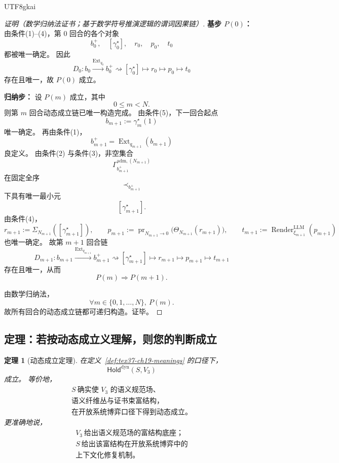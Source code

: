 \documentclass[12pt]{article}
\newtheorem{theorem}{定理}[section]
\newcommand{\Render}{\operatorname{Render}}
\begin{document}
\begin{CJK*}{UTF8}{gkai}
\begin{proof}[证明（数学归纳法证书；基于数学符号推演逻辑的谓词因果链）]
\textbf{基步 $P(0)$：}
由条件(1)--(4)，第 $0$ 回合的各个对象
\[
  b_0^+,\quad
  [\gamma_0^\star],\quad
  r_0,\quad
  p_0,\quad
  t_0
\]
都被唯一确定。
因此
\[
  D_0:
  b_0
  \xrightarrow{\operatorname{Ext}_{q_0}}
  b_0^+
  \rightsquigarrow
  [\gamma_0^\star]
  \mapsto
  r_0
  \mapsto
  p_0
  \mapsto
  t_0
\]
存在且唯一，故 $P(0)$ 成立。

\textbf{归纳步：}
设 $P(m)$ 成立，其中
\[
  0\le m<N.
\]
则第 $m$ 回合动态成立链已唯一构造完成。
由条件(5)，下一回合起点
\[
  b_{m+1}:=\gamma_m^\star(1)
\]
唯一确定。
再由条件(1)，
\[
  b_{m+1}^+=\operatorname{Ext}_{q_{m+1}}(b_{m+1})
\]
良定义。
由条件(2) 与条件(3)，非空集合
\[
  \Gamma_{b_{m+1}^+}^{\mathrm{adm},(N_{m+1})}
\]
在固定全序
\[
  \prec_{b_{m+1}^+}
\]
下具有唯一最小元
\[
  [\gamma_{m+1}^\star].
\]
由条件(4)，
\[
  r_{m+1}:=\Sigma_{N_{m+1}}([\gamma_{m+1}^\star]),
  \qquad
  p_{m+1}:=\operatorname{pr}_{N_{m+1}\to 0}\bigl(\Theta_{N_{m+1}}(r_{m+1})\bigr),
  \qquad
  t_{m+1}:=\Render^{\mathrm{LLM}}_{\xi_{m+1}}(p_{m+1})
\]
也唯一确定。
故第 $m+1$ 回合链
\[
  D_{m+1}:
  b_{m+1}
  \xrightarrow{\operatorname{Ext}_{q_{m+1}}}
  b_{m+1}^+
  \rightsquigarrow
  [\gamma_{m+1}^\star]
  \mapsto
  r_{m+1}
  \mapsto
  p_{m+1}
  \mapsto
  t_{m+1}
\]
存在且唯一，从而
\[
  P(m)\Rightarrow P(m+1).
\]

由数学归纳法，
\[
  \forall m\in\{0,1,\dots,N\},\ P(m).
\]
故所有回合的动态成立链都可递归构造。证毕。
\end{proof}

\subsection{定理：若按动态成立义理解，则您的判断成立}
\label{subsec:tex37-ch19-theorem}

\begin{theorem}[动态成立定理]
\label{thm:tex37-ch19-dynamic-hold}
在定义~\ref{def:tex37-ch19-meanings} 的口径下，
\[
  \mathsf{Hold}^{\mathrm{dyn}}(S,V_3)
\]
成立。
等价地，
\[
  \boxed{
    \begin{gathered}
      S\ \text{确实使 }V_3\text{ 的语义规范场、}\\
      \text{语义纤维丛与证书束富结构，}\\
      \text{在开放系统博弈口径下得到动态成立。}
    \end{gathered}
  }
\]
更准确地说，
\[
  \boxed{
    \begin{gathered}
      V_3\ \text{给出语义规范场的富结构底座；}\\
      S\ \text{给出该富结构在开放系统博弈中的}\\
      \text{上下文化修复机制。}
    \end{gathered}
  }
\]
\end{theorem}


\end{CJK*}
\end{document}
